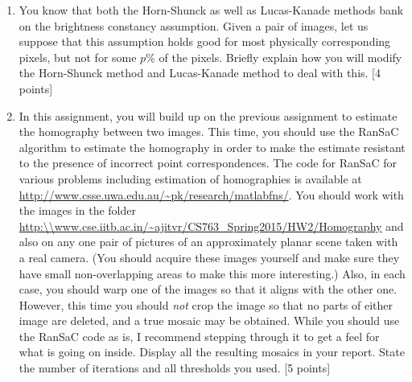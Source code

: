 \documentclass[11pt]{article}
\begin{document}
\begin{enumerate}
\item You know that both the Horn-Shunck as well as Lucas-Kanade methods bank on the brightness constancy assumption. Given a pair of images, let us suppose that this assumption holds good for most physically corresponding pixels, but not for some $p \%$ of the pixels. Briefly explain how you will modify the Horn-Shunck method and Lucas-Kanade method to deal with this. \textsf{[4 points]}

\item In this assignment, you will build up on the previous assignment to estimate the homography between two images. This time, you should use the RanSaC algorithm to estimate the homography in order to make the estimate resistant to the presence of incorrect point correspondences. The code for RanSaC for various problems including estimation of homographies is available at \url{http://www.csse.uwa.edu.au/~pk/research/matlabfns/}. You should work with the images in the folder \url{http:\\www.cse.iitb.ac.in/~ajitvr/CS763_Spring2015/HW2/Homography} and also on any one pair of pictures of an approximately planar scene taken with a real camera. (You should acquire these images yourself and make sure they have small non-overlapping areas to make this more interesting.) Also, in each case, you should warp one of the images so that it aligns with the other one. However, this time you should \emph{not} crop the image so that no parts of either image are deleted, and a true mosaic may be obtained. While you should use the RanSaC code as is, I recommend stepping through it to get a feel for what is going on inside. Display all the resulting mosaics in your report. State the number of iterations and all thresholds you used. \textsf{[5 points]}


\end{enumerate}
\end{document}
